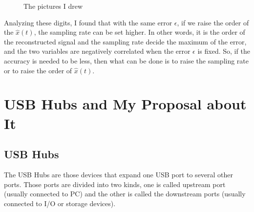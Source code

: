 \documentclass{article}
\begin{document}
\begin{figure}[!h]
	\centering
	\hspace{0 pt}
	\caption{The pictures I drew}
	\label{fig:maxes}
\end{figure}

Analyzing these digits, I found that with the same error $\epsilon$, if we raise the order of the $\hat{x}(t)$, the sampling rate can be set higher. In other words, it is the order of the reconstructed signal and the sampling rate decide the maximum of the error, and the two variables are negatively correlated when the error $\epsilon$ is fixed. So, if the accuracy is needed to be less, then what can be done is to raise the sampling rate or to raise the order of $\hat{x}(t)$.

\section{USB Hubs and My Proposal about It}
\subsection{USB Hubs}
The USB Hubs are those devices that expand one USB port to several other ports. Those ports are divided into two kinds, one is called upstream port (usually connected to PC) and the other is called the downstream ports (usually connected to I/O or storage devices). 
\end{document}
